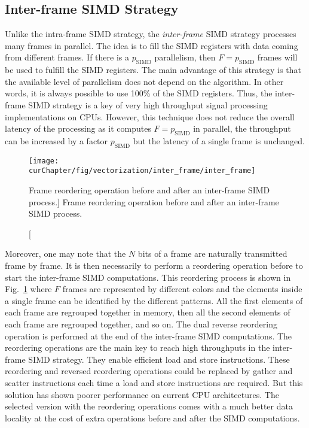 \subsection{Inter-frame SIMD Strategy}
\label{sec:opt_vec_inter}

Unlike the intra-frame SIMD strategy, the \emph{inter-frame} SIMD strategy
processes many frames in parallel. The idea is to fill the SIMD registers with
data coming from different frames. If there is a $p_\text{SIMD}$ parallelism,
then $F = p_\text{SIMD}$ frames will be used to fulfill the SIMD registers. The
main advantage of this strategy is that the available level of parallelism does
not depend on the algorithm. In other words, it is always possible to use 100\%
of the SIMD registers. Thus, the inter-frame SIMD strategy is a key of very high
throughput signal processing implementations on CPUs. However, this technique
does not reduce the overall latency of the processing as it computes $F =
p_\text{SIMD}$ in parallel, the throughput can be increased by a factor
$p_\text{SIMD}$ but the latency of a single frame is unchanged.

\begin{figure}[htp]
  \centering
  \texttt{[image: \\curChapter/fig/vectorization/inter\_frame/inter\_frame]}
  \caption
    [Frame reordering operation before and after an inter-frame SIMD process.]
    {Frame reordering operation before and after an inter-frame SIMD process.}
  \label{fig:opt_vec_inter_frame}
\end{figure}

Moreover, one may note that the $N$ bits of a frame are naturally transmitted
frame by frame. It is then necessarily to perform a reordering operation before
to start the inter-frame SIMD computations. This reordering process is shown in
Fig.~\ref{fig:opt_vec_inter_frame} where $F$ frames are represented by different
colors and the elements inside a single frame can be identified by the different
patterns. All the first elements of each frame are regrouped together in memory,
then all the second elements of each frame are regrouped together, and so on.
The dual reverse reordering operation is performed at the end of the inter-frame
SIMD computations. The reordering operations are the main key to reach high
throughputs in the inter-frame SIMD strategy. They enable efficient load and
store instructions. These reordering and reversed reordering operations could be
replaced by gather and scatter instructions each time a load and store
instructions are required. But this solution has shown poorer performance on
current CPU architectures. The selected version with the reordering operations
comes with a much better data locality at the cost of extra operations before
and after the SIMD computations.

